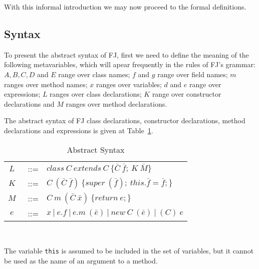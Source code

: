 With this informal introduction we may now proceed to the formal definitions.

\subsection{Syntax}

To present the abstract syntax of FJ, first we need to define the meaning of the
following metavariables, which will apear frequently in the rules of FJ's
grammar: ${A, B, C, D}$ and ${E}$ range over class names; $f$
and $g$ range over field names; $m$ ranges over method names;
$x$ ranges over variables; $d$ and $e$ range over
expressions; $L$ ranges over class declarations; $K$ range over
constructor declarations and $M$ ranges over method declarations.

The abstract syntax of FJ class declarations, constructor declarations, method
declarations and expressions is given at Table~\ref{abstractsyntax}.

\begin{table}[ht!]
    \caption{Abstract Syntax}
    \begin{tabular}{ccl}
            $L$&~::= & $class\ C~extends~C\ \{\bar{C} \ \bar{f};\ K\
        \bar{M}\}$\\ 
            \vspace{0.8mm}
            $K$&~::= &
        $C~(\bar{C}~\bar{f})\
        \{super~(\bar{f});~this.\bar{f}=\bar{f};\}$\\
            \vspace{0.8mm}
        $M$&~::= & $C~m~(\bar{C}~\bar{x})\ \{return~e;\}$\\
            \vspace{0.8mm}
        $e$&~::= & $x~|~e.f~|~e.m~(\bar{e})~|~new~C~(\bar{e})~|~(C)~e$ \\
    \end{tabular} \\
    \vspace{1.5mm}
    \label{abstractsyntax}
\end{table}

The variable \texttt{this} is assumed to be included in the set of variables, but
it cannot be used as the name of an argument to a method. 

